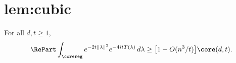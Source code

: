 \chapter{lem:cubic}\label{chap:lem_cubic}
\begin{lemma}\label{lem:cubic}
\leanok
For all $d,t\ge 1$,
\[
  \RePart\int_{\corereg}e^{-2t\|\lambda\|^2}e^{-4itT(\lambda)}\,d\lambda
  \ge \bigl[1-O(n^3/t)\bigr]\core(d,t).
\]
\end{lemma}

